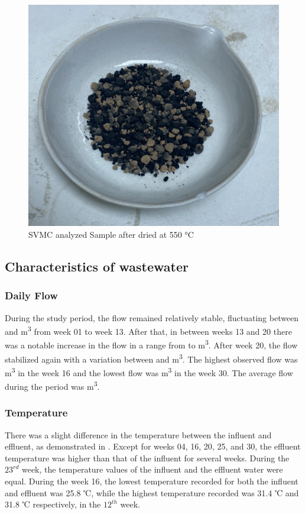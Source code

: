 \begin{figure}[H]
\centering
\includegraphics[width=0.6\linewidth]{results/SVMC sample.jpg}
\caption{\ac{SVMC} analyzed Sample after dried at 550 °C}
\label{fig:SVMC_sample}
\end{figure}

\subsection{Characteristics of wastewater}

\subsubsection{Daily Flow}
During the study period, the flow remained relatively stable, fluctuating between  and  \unit{m^3} from week 01 to week 13. After that, in between weeks 13 and 20 there was a notable increase in the flow in a range from  to  \unit{m^3}. After week 20, the flow stabilized again with a variation between  and  \unit{m^3}. The highest observed flow was  \unit{m^3} in the week 16 and the lowest flow was  \unit{m^3} in the week 30. The average flow during the period was  \unit{m^3}. 



\subsubsection{Temperature}
There was a slight difference in the temperature between the influent and effluent, as demonstrated in . Except for weeks 04, 16, 20, 25, and 30, the effluent temperature was higher than that of the influent for several weeks. During the $23^{rd}$ week, the temperature values of the influent and the effluent water were equal. During the week 16, the lowest temperature recorded for both the influent and effluent was 25.8 ℃, while the highest temperature recorded was 31.4 ℃ and 31.8 ℃ respectively, in the $12^{th}$ week.

